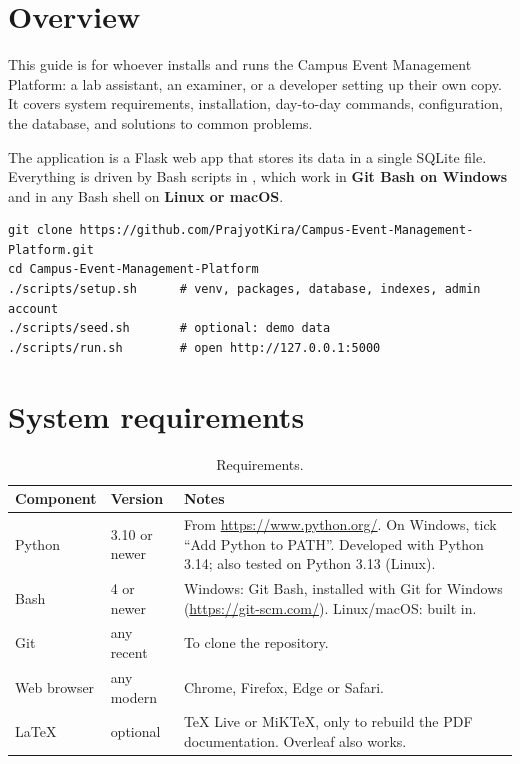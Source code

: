 \documentclass[11pt,a4paper]{article}
\begin{document}

\tableofcontents
\newpage

\section{Overview}

This guide is for whoever installs and runs the Campus Event Management Platform: a lab
assistant, an examiner, or a developer setting up their own copy. It covers system requirements,
installation, day-to-day commands, configuration, the database, and solutions to common problems.

The application is a Flask web app that stores its data in a single SQLite file. Everything is
driven by Bash scripts in , which work in \textbf{Git Bash on Windows} and in any
Bash shell on \textbf{Linux or macOS}.

\begin{note}
\begin{lstlisting}[style=shell, backgroundcolor=\color{white}, frame=none]
git clone https://github.com/PrajyotKira/Campus-Event-Management-Platform.git
cd Campus-Event-Management-Platform
./scripts/setup.sh      # venv, packages, database, indexes, admin account
./scripts/seed.sh       # optional: demo data
./scripts/run.sh        # open http://127.0.0.1:5000
\end{lstlisting}
\end{note}

\section{System requirements}

\begin{table}[H]
\centering
\small
\begin{tabularx}{\linewidth}{@{}l l X@{}}
\toprule
\textbf{Component} & \textbf{Version} & \textbf{Notes} \\
\midrule
Python      & 3.10 or newer & From \url{https://www.python.org/}. On Windows, tick ``Add Python to PATH''. Developed with Python 3.14; also tested on Python 3.13 (Linux). \\
Bash        & 4 or newer    & Windows: Git Bash, installed with Git for Windows (\url{https://git-scm.com/}). Linux/macOS: built in. \\
Git         & any recent    & To clone the repository. \\
Web browser & any modern    & Chrome, Firefox, Edge or Safari. \\
LaTeX       & optional      & TeX Live or MiKTeX, only to rebuild the PDF documentation. Overleaf also works. \\
\bottomrule
\end{tabularx}
\caption{Requirements.}
\end{table}
\end{document}
